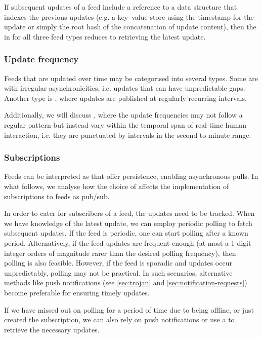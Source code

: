 If subsequent updates of a feed include a reference to a data structure that indexes the previous updates (e.g. a key--value store using the timestamp for the update or simply the root hash of the concatenation of update content), then the  in for all three feed types reduces to retrieving the latest update.

\subsubsection{Update frequency}

Feeds that are updated over time may be categorised into several types. Some are  with irregular asynchronicities, i.e. updates that can have unpredictable gaps. Another type is , where updates are published at regularly recurring intervals.

Additionally, we will discuss , where the update frequencies may not follow a regular pattern but instead vary within the temporal span of real-time human interaction, i.e. they are punctuated by intervals in the second to minute range.

\subsubsection{Subscriptions}

Feeds can be interpreted as  that offer persistence, enabling asynchronous pulls. In what follows, we analyse how the choice of  affects the implementation of subscriptions to feeds as pub/sub.

In order to cater for subscribers of a feed, the updates need to be tracked. When we have knowledge of the latest update, we can employ periodic polling to fetch subsequent updates. 
If the feed is periodic, one can start polling after a known period. Alternatively, if the feed updates are frequent enough (at most a 1-digit integer orders of magnitude rarer than the desired polling frequency), then polling is also feasible.
However, if the feed is sporadic and updates occur unpredictably, polling may not be practical. In such scenarios, alternative methods like push notifications (see \ref{sec:trojan} and \ref{sec:notification-requests}) become preferable for ensuring timely updates.

If we have missed out on polling for a period of time due to being offline, or just created the subscription, we can also rely on push notifications or use a  to retrieve the necessary updates. 

